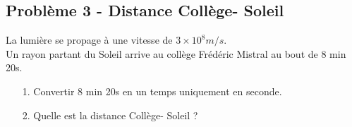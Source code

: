 \documentclass[12pt]{article}
\begin{document}
\subsection*{Problème 3 - Distance Collège- Soleil}

La lumière se propage à une vitesse de $3 \times 10^8 m/s$. \\
Un rayon partant du Soleil arrive au collège Frédéric Mistral au bout de 8 min 20s.


\begin{itemize}
\item[1.] Convertir 8 min 20s en un temps uniquement en seconde.
\item[2.] Quelle est la distance Collège- Soleil ? 
\end{itemize}
\end{document}
